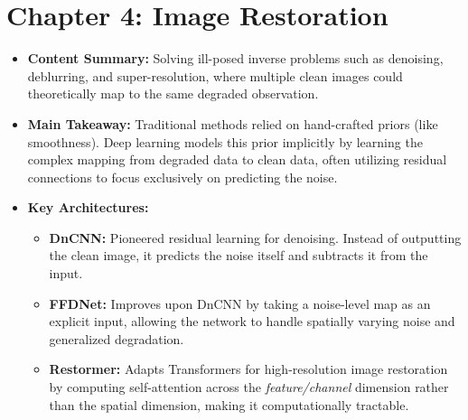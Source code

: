 \section*{Chapter 4: Image Restoration}
\begin{itemize}
    \item \textbf{Content Summary:} Solving ill-posed inverse problems such as denoising, deblurring, and super-resolution, where multiple clean images could theoretically map to the same degraded observation.
    \item \textbf{Main Takeaway:} Traditional methods relied on hand-crafted priors (like smoothness). Deep learning models this prior implicitly by learning the complex mapping from degraded data to clean data, often utilizing residual connections to focus exclusively on predicting the noise.
    \item \textbf{Key Architectures:}
    \begin{itemize}
        \item \textbf{DnCNN:} Pioneered residual learning for denoising. Instead of outputting the clean image, it predicts the noise itself and subtracts it from the input.
        \item \textbf{FFDNet:} Improves upon DnCNN by taking a noise-level map as an explicit input, allowing the network to handle spatially varying noise and generalized degradation.
        \item \textbf{Restormer:} Adapts Transformers for high-resolution image restoration by computing self-attention across the \textit{feature/channel} dimension rather than the spatial dimension, making it computationally tractable.
    \end{itemize}
\end{itemize}

